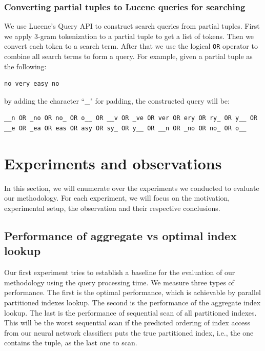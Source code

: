 \documentclass[conference]{IEEEtran}
\begin{document}
\subsubsection{Converting partial tuples to Lucene queries for searching}
We use Lucene's Query API to construct search queries from partial tuples. First we apply 3-gram tokenization to a partial tuple to get a list of tokens. Then we convert each token to a search term. After that we use the logical \verb|OR| operator to combine all search terms to form a query.
For example, given a partial tuple as the following:
\begin{verbatim}
no very easy no
\end{verbatim}
by adding the character ``\_" for padding, the constructed query will be:
\begin{verbatim}
__n OR _no OR no_ OR o__ OR __v OR _ve OR ver OR ery OR ry_ OR y__ OR
__e OR _ea OR eas OR asy OR sy_ OR y__ OR __n OR _no OR no_ OR o__
\end{verbatim}

\section{Experiments and observations}

In this section, we will enumerate over the experiments we conducted to evaluate our methodology.  For each experiment, we will focus on the motivation, experimental setup, the observation and their respective conclusions.

\subsection{Performance of aggregate vs optimal index lookup}
\label{subsection:perf_baseline_expt}

Our first experiment tries to establish a baseline for the evaluation of our methodology using the query processing time. We measure three types of performance. The first is the optimal performance, which is achievable by parallel partitioned indexes lookup. The second is the performance of the aggregate index lookup. The last is the performance of sequential scan of all partitioned indexes. This will be the worst sequential scan if the predicted ordering of index access from our neural network classifiers puts the true partitioned index, i.e., the one contains the tuple, as the last one to scan.
\end{document}
